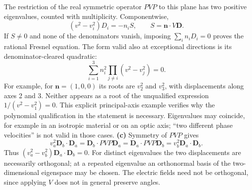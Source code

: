 The restriction of the real symmetric operator $PVP$ to this plane
has two positive eigenvalues, counted with multiplicity. Componentwise,
\[
(v^2-v_i^2)D_i=-n_i S,\qquad S=\mathbf n\cdot V\mathbf D.
\]
If $S\ne0$ and none of the denominators vanish, imposing
$\sum_i n_iD_i=0$ proves the rational Fresnel equation. The form valid
also at exceptional directions is its denominator-cleared quadratic:
\[
\boxed{\sum_{i=1}^3 n_i^2\prod_{j\ne i}(v^2-v_j^2)=0.}
\]
For example, for $\mathbf n=(1,0,0)$ its roots are $v_2^2$ and
$v_3^2$, with displacements along axes 2 and 3. Neither appears as a
root of the unqualified expression $1/(v^2-v_1^2)=0$. This explicit
principal-axis example verifies why the polynomial qualification in
the statement is necessary. Eigenvalues may coincide, for example
in an isotropic material or on an optic axis; ``two different phase
velocities'' is not valid in those cases.
\textbf{(c)} Symmetry of $PVP$ gives
\[
v_a^2\mathbf D_b\cdot\mathbf D_a
=\mathbf D_b\cdot PVP\mathbf D_a
=\mathbf D_a\cdot PVP\mathbf D_b
=v_b^2\mathbf D_a\cdot\mathbf D_b.
\]
Thus $(v_a^2-v_b^2)\mathbf D_a\cdot\mathbf D_b=0$.
For distinct eigenvalues the two displacements are necessarily
orthogonal; at a repeated eigenvalue an orthonormal basis of the
two-dimensional eigenspace may be chosen. The electric fields
need not be orthogonal, since applying $V$ does not in general
preserve angles.

